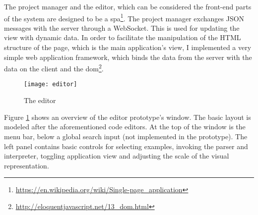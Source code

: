 The project manager and the editor, which can be considered the front-end parts of the system are designed to be a \acrlong{spa}\footnote{\url{https://en.wikipedia.org/wiki/Single-page_application}}. The project manager exchanges JSON messages with the server through a WebSocket. This is used for updating the view with dynamic data. In order to facilitate the manipulation of the HTML structure of the page, which is the main application's view, I implemented a very simple web application framework, which binds the data from the server with the data on the client and the \acrlong{dom}\footnote{\url{http://eloquentjavascript.net/13_dom.html}}.

\begin{figure}[h!]
\centering
\texttt{[image: editor]}
\caption{The editor}
\label{fig:editor}
\end{figure}

Figure \ref{fig:editor} shows an overview of the editor prototype's window. The basic layout is modeled after the aforementioned code editors. At the top of the window is the menu bar, below a global search input (not implemented in the prototype). The left panel contains basic controls for selecting examples, invoking the parser and interpreter, toggling application view and adjusting the scale of the visual representation.

